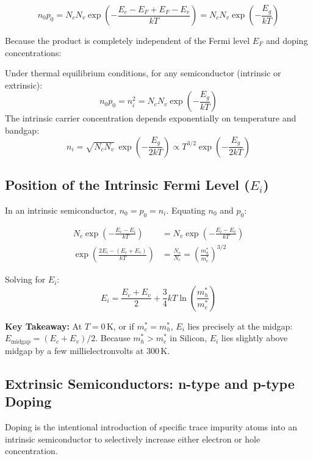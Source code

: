 \documentclass[12pt,a4paper]{article}
\begin{document}
\begin{equation}
  n_0 p_0 = N_c N_v \exp\left(-\frac{E_c - E_F + E_F - E_v}{k T}\right) = N_c N_v \exp\left(-\frac{E_g}{k T}\right)
\end{equation}

Because the product is completely independent of the Fermi level $E_F$ and doping concentrations:

\begin{tcolorbox}[formulabox, title={\textbf{Law of Mass Action}}]
Under thermal equilibrium conditions, for any semiconductor (intrinsic or extrinsic):
\begin{equation}
  n_0 p_0 = n_i^2 = N_c N_v \exp\left(-\frac{E_g}{k T}\right)
\end{equation}
The intrinsic carrier concentration depends exponentially on temperature and bandgap:
\begin{equation}
  n_i = \sqrt{N_c N_v}\,\exp\left(-\frac{E_g}{2 k T}\right) \propto T^{3/2} \exp\left(-\frac{E_g}{2 k T}\right)
\end{equation}
\end{tcolorbox}

\subsection{Position of the Intrinsic Fermi Level (\texorpdfstring{$E_i$}{Ei})}
In an intrinsic semiconductor, $n_0 = p_0 = n_i$. Equating $n_0$ and $p_0$:

\begin{align*}
  N_c \exp\left(-\frac{E_c - E_i}{k T}\right) &= N_v \exp\left(-\frac{E_i - E_v}{k T}\right) \\
  \exp\left(\frac{2E_i - (E_c + E_v)}{k T}\right) &= \frac{N_v}{N_c} = \left(\frac{m_h^*}{m_e^*}\right)^{3/2}
\end{align*}

Solving for $E_i$:
\begin{equation}
  E_i = \frac{E_c + E_v}{2} + \frac{3}{4} k T \ln\left(\frac{m_h^*}{m_e^*}\right)
\end{equation}

\textbf{Key Takeaway:} At $T = 0\,\text{K}$, or if $m_e^* = m_h^*$, $E_i$ lies precisely at the midgap: $E_{\text{midgap}} = (E_c + E_v)/2$. Because $m_h^* > m_e^*$ in Silicon, $E_i$ lies slightly above midgap by a few millielectronvolts at $300\,\text{K}$.

\subsection{Extrinsic Semiconductors: n-type and p-type Doping}
Doping is the intentional introduction of specific trace impurity atoms into an intrinsic semiconductor to selectively increase either electron or hole concentration.
\end{document}
